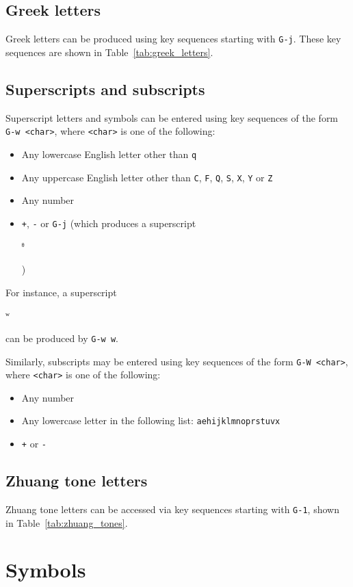 \documentclass[oneside]{memoir}
\newcommand{\key}{\verb}
\newcommand{\out}[1]{\colorbox{gray!20}{\strut{}#1}}
\begin{document}
{{{\subsection{Greek letters}
\label{sec:greek_letters}

Greek letters can be produced using key sequences starting with \key|G-j|.
These key sequences are shown in Table~\ref{tab:greek_letters}.

\subsection{Superscripts and subscripts}
\label{sec:superscripts-subscripts}

Superscript letters and symbols can be entered using key sequences of the form \key|G-w <char>|,
  where \key|<char>| is one of the following:
\begin{itemize}[noitemsep]
\item Any lowercase English letter other than \key|q|
\item Any uppercase English letter other than \key|C|, \key|F|, \key|Q|, \key|S|, \key|X|, \key|Y| or \key|Z|
\item Any number
\item \key|+|, \key|-| or \key|G-j| (which produces a superscript \out{ᶿ})
\end{itemize}
For instance, a superscript \out{ʷ} can be produced by \key|G-w w|.

Similarly, subscripts may be entered using key sequences of the form \key|G-W <char>|,
  where \key|<char>| is one of the following:
\begin{itemize}[noitemsep]
\item Any number
\item Any lowercase letter in the following list: \texttt{aehijklmnoprstuvx}
\item \key|+| or \key|-|
\end{itemize}

\subsection{Zhuang tone letters}
\label{sec:zhuang_tones}

Zhuang tone letters can be accessed via key sequences starting with \key|G-1|, shown in Table~\ref{tab:zhuang_tones}.

\section{Symbols}
\label{sec:symbols}

}}}
\end{document}
